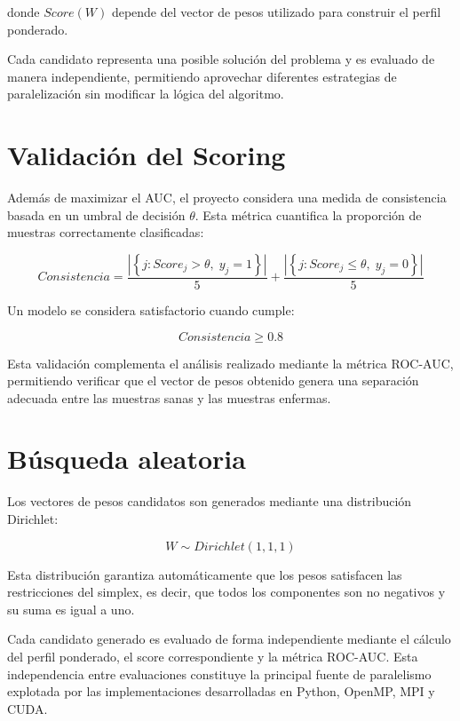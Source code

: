 donde $Score(W)$ depende del vector de pesos utilizado para construir el perfil ponderado.

Cada candidato representa una posible solución del problema y es evaluado de manera independiente, permitiendo aprovechar diferentes estrategias de paralelización sin modificar la lógica del algoritmo.

\section{Validación del Scoring}

Además de maximizar el AUC, el proyecto considera una medida de consistencia basada en un umbral de decisión $\theta$. Esta métrica cuantifica la proporción de muestras correctamente clasificadas:

\begin{equation}
Consistencia=
\frac{\left|\left\{j:Score_j>\theta,\;y_j=1\right\}\right|}{5}
+
\frac{\left|\left\{j:Score_j\le\theta,\;y_j=0\right\}\right|}{5}
\end{equation}

Un modelo se considera satisfactorio cuando cumple:

\begin{equation}
Consistencia \ge 0.8
\end{equation}

Esta validación complementa el análisis realizado mediante la métrica ROC-AUC, permitiendo verificar que el vector de pesos obtenido genera una separación adecuada entre las muestras sanas y las muestras enfermas.

\section{Búsqueda aleatoria}

Los vectores de pesos candidatos son generados mediante una distribución Dirichlet:

\begin{equation}
W \sim Dirichlet(1,1,1)
\end{equation}

Esta distribución garantiza automáticamente que los pesos satisfacen las restricciones del simplex, es decir, que todos los componentes son no negativos y su suma es igual a uno.

Cada candidato generado es evaluado de forma independiente mediante el cálculo del perfil ponderado, el score correspondiente y la métrica ROC-AUC. Esta independencia entre evaluaciones constituye la principal fuente de paralelismo explotada por las implementaciones desarrolladas en Python, OpenMP, MPI y CUDA.